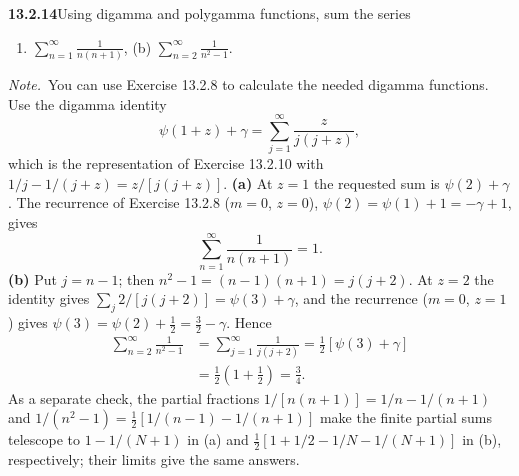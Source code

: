 \par\bigskip
\noindent\textbf{13.2.14}\quad Using digamma and polygamma functions, sum the
series
\begin{enumerate}
\item[(a)] $\displaystyle\sum_{n=1}^{\infty}\frac{1}{n(n+1)}$,\quad
(b) $\displaystyle\sum_{n=2}^{\infty}\frac{1}{n^{2}-1}$.
\end{enumerate}
\emph{Note.}~You can use Exercise 13.2.8 to calculate the needed digamma
functions.
\solution
Use the digamma identity
\[
\psi(1+z)+\gamma=\sum_{j=1}^{\infty}\frac{z}{j(j+z)},
\]
which is the representation of Exercise 13.2.10 with
$1/j-1/(j+z)=z/[j(j+z)]$.
\textbf{(a)} At $z=1$ the requested sum is
$\psi(2)+\gamma$.  The recurrence of Exercise 13.2.8 ($m=0$, $z=0$),
$\psi(2)=\psi(1)+1=-\gamma+1$, gives
\[
\boxed{\sum_{n=1}^{\infty}\frac1{n(n+1)}=1}.
\]
\textbf{(b)} Put $j=n-1$; then $n^2-1=(n-1)(n+1)=j(j+2)$.  At $z=2$
the identity gives $\sum_j2/[j(j+2)]=\psi(3)+\gamma$, and the
recurrence ($m=0$, $z=1$) gives $\psi(3)=\psi(2)+\tfrac12
=\tfrac32-\gamma$.  Hence
\begin{align*}
\sum_{n=2}^{\infty}\frac1{n^2-1}
&=\sum_{j=1}^{\infty}\frac1{j(j+2)}
=\frac12[\psi(3)+\gamma]\\
&=\frac12\left(1+\frac12\right)=\boxed{\frac34}.
\end{align*}
As a separate check, the partial fractions
$1/[n(n+1)]=1/n-1/(n+1)$ and
$1/(n^2-1)=\tfrac12[1/(n-1)-1/(n+1)]$ make the finite partial sums
telescope to $1-1/(N+1)$ in (a) and
$\tfrac12[1+1/2-1/N-1/(N+1)]$ in (b), respectively;
their limits give the same answers.


